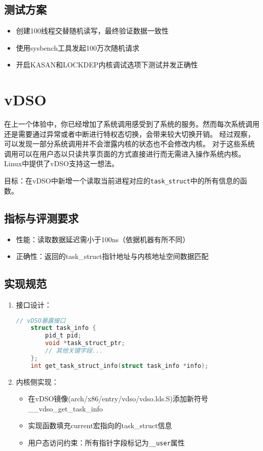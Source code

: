 \subsection*{测试方案}
\begin{itemize}
    \item 创建100线程交替随机读写，最终验证数据一致性
    \item 使用sysbench工具发起100万次随机请求
    \item 开启KASAN和LOCKDEP内核调试选项下测试并发正确性
\end{itemize}

\section{vDSO}
在上一个体验中，你已经增加了系统调用感受到了系统的服务。然而每次系统调用还是需要通过异常或者中断进行特权态切换，会带来较大切换开销。
经过观察，可以发现一部分系统调用并不会泄露内核的状态也不会修改内核。
对于这些系统调用可以在用户态以只读共享页面的方式直接进行而无需进入操作系统内核。
Linux中提供了vDSO支持这一想法。

目标：在vDSO中新增一个读取当前进程对应的\texttt{task\_struct}中的所有信息的函数。

\subsection*{指标与评测要求}
\begin{itemize}
    \item 性能：读取数据延迟需小于100ns（依据机器有所不同）
    \item 正确性：返回的task\_struct指针地址与内核地址空间数据匹配
\end{itemize}

\subsection*{实现规范}
\begin{enumerate}
    \item 接口设计：
    \begin{lstlisting}[language=C]
    // vDSO暴露接口
    struct task_info {
        pid_t pid;
        void *task_struct_ptr;
        // 其他关键字段...
    };
    int get_task_struct_info(struct task_info *info);
    \end{lstlisting}
    
    \item 内核侧实现：
    \begin{itemize}
        \item 在vDSO镜像(arch/x86/entry/vdso/vdso.lds.S)添加新符号\_\_vdso\_get\_task\_info
        \item 实现函数填充current宏指向的task\_struct信息
        \item 用户态访问约束：所有指针字段标记为\texttt{\_\_user}属性
    \end{itemize}

\end{enumerate}


